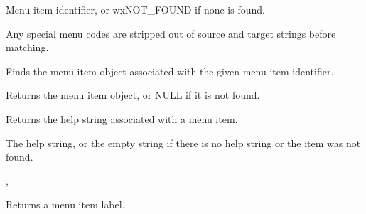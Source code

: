 
Menu item identifier, or wxNOT_FOUND if none is found.


Any special menu codes are stripped out of source and target strings
before matching.



\label{wxmenufinditemforid}


Finds the menu item object associated with the given menu item identifier.




Returns the menu item object, or NULL if it is not found.



\label{wxmenugethelpstring}


Returns the help string associated with a menu item.




The help string, or the empty string if there is no help string or the
item was not found.


, 

\label{wxmenugetlabel}


Returns a menu item label.




